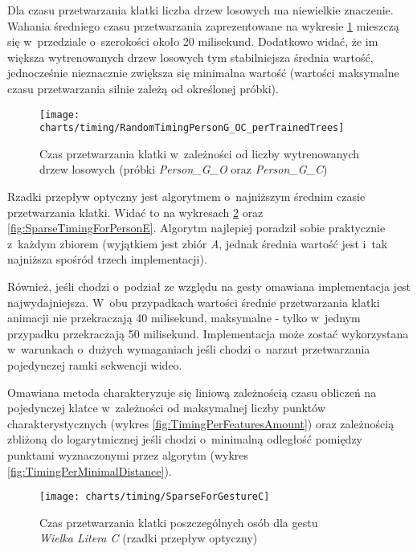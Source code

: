    Dla czasu przetwarzania klatki liczba drzew losowych ma niewielkie znaczenie. Wahania średniego czasu przetwarzania zaprezentowane na wykresie \ref{fig:TimingPerTrainedTreesAmount} mieszczą się w~przedziale o~szerokości około 20 milisekund. Dodatkowo widać, że im większa wytrenowanych drzew losowych tym stabilniejsza średnia wartość, jednocześnie nieznacznie zwiększa się minimalna wartość (wartości maksymalne czasu przetwarzania silnie zależą od określonej próbki).

    \begin{figure}[!ht]
      \centering
      \texttt{[image: charts/timing/RandomTimingPersonG\_OC\_perTrainedTrees]}
      \caption[Czas przetwarzania klatki w~zależności od liczby wytrenowanych drzew losowych]
              {Czas przetwarzania klatki w~zależności od liczby wytrenowanych drzew losowych (próbki \textit{Person\_G\_O} oraz \textit{Person\_G\_C})}
      \label{fig:TimingPerTrainedTreesAmount}
    \end{figure}

    \newpage
    Rzadki przepływ optyczny jest algorytmem o~najniższym średnim czasie przetwarzania klatki. Widać to na wykresach \ref{fig:SparseForGestureC} oraz \ref{fig:SparseTimingForPersonE}. Algorytm najlepiej poradził sobie praktycznie z~każdym zbiorem (wyjątkiem jest zbiór \textit{A}, jednak średnia wartość jest i~tak najniższa spośród trzech implementacji).

    Również, jeśli chodzi o~podział ze względu na gesty omawiana implementacja jest najwydajniejsza. W~obu przypadkach wartości średnie przetwarzania klatki animacji nie przekraczają 40 milisekund, maksymalne - tylko w~jednym przypadku przekraczają 50 milisekund. Implementacja może zostać wykorzystana w~warunkach o~dużych wymaganiach jeśli chodzi o~narzut przetwarzania pojedynczej ramki sekwencji wideo.

    Omawiana metoda charakteryzuje się liniową zależnością czasu obliczeń na pojedynczej klatce w~zależności od maksymalnej liczby punktów charakterystycznych (wykres \ref{fig:TimingPerFeaturesAmount}) oraz zależnością zbliżoną do logarytmicznej jeśli chodzi o~minimalną odległość pomiędzy punktami wyznaczonymi przez algorytm (wykres \ref{fig:TimingPerMinimalDistance}).

    \begin{figure}[!ht]
      \centering
      \texttt{[image: charts/timing/SparseForGestureC]}
      \caption[Czas przetwarzania klatki poszczególnych osób dla gestu C]
              {Czas przetwarzania klatki poszczególnych osób dla gestu\\\textit{Wielka Litera C} (rzadki przepływ optyczny)}
      \label{fig:SparseForGestureC}
    \end{figure}

